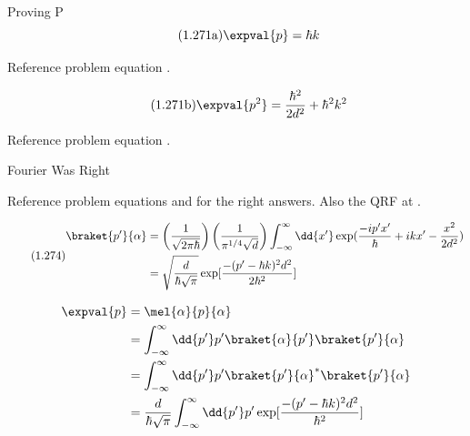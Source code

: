 \begin{answer}
  \begin{answerpart}{Proving P}
    \begin{equation}
      \tag{1.271a}
      \expval{p} = \hbar k
    \end{equation}

    Reference problem  equation
    .
    
    \begin{equation}
      \tag{1.271b}
      \expval{p^2} = \frac{\hbar^2}{2d^2} + \hbar^2k^2
    \end{equation}

    Reference problem  equation
    .
  \end{answerpart}

  \begin{answerpart}{Fourier Was Right}

    Reference problem  equations
     and  for the right
    answers.  Also the QRF at .

    \begin{equation}
      \tag{1.274}
      \begin{split}
        \braket{p'}{\alpha}
        &=
        \left(\frac{1}{\sqrt{2\pi\hbar}}\right)
        \left(\frac{1}{\pi^{1/4}\sqrt{d}}\right)
        \int_{-\infty}^{\infty} \dd{x'}
        \exp(\frac{-ip'x'}{\hbar} + ikx' - \frac{x^2}{2d^2})
        \\
        &= \sqrt{\frac{d}{\hbar\sqrt{\pi}}}
        \exp[\frac{-(p' - \hbar k)^2d^2}{2\hbar^2}]
        \\
      \end{split}
    \end{equation}

    \begin{equation}
      \begin{split}
        \expval{p}
        &= \mel{\alpha}{p}{\alpha}\\
        &= \int_{-\infty}^{\infty} \dd{p'} p' \braket{\alpha}{p'}\braket{p'}{\alpha}\\
        &= \int_{-\infty}^{\infty} \dd{p'} p' \braket{p'}{\alpha}^{*}\braket{p'}{\alpha}
        \\
        &=
        \frac{d}{\hbar\sqrt{\pi}}
        \int_{-\infty}^{\infty} \dd{p'} p'
        \exp[\frac{-(p' - \hbar k)^2d^2}{\hbar^2}]
        \\
      \end{split}
    \end{equation}


\end{answerpart}
\end{answer}
